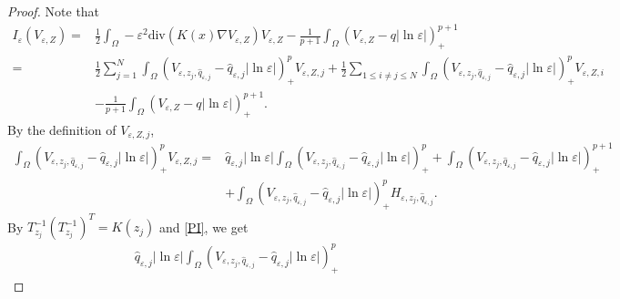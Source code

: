 \documentclass[12pt,reqno]{amsart}
\numberwithin{equation}{section}
\theoremstyle{definition}
\theoremstyle{remark}
\begin{document}
\begin{proof}
Note that
\begin{equation}\label{218}
\begin{split}
I_\varepsilon(V_{\varepsilon,Z})=&\frac{1}{2}\int_{\Omega}-\varepsilon^2\text{div}\left( K(x)\nabla V_{\varepsilon,Z}  \right)V_{\varepsilon,Z}-\frac{1}{p+1}\int_{\Omega}\left (V_{\varepsilon,Z}-q|\ln\varepsilon|\right )^{p+1}_+ \\
=&\frac{1}{2}\sum_{j=1}^N\int_{\Omega}\left (V_{\varepsilon,z_j,\hat{q}_{\varepsilon,j}}-\hat{q}_{\varepsilon,j}|\ln\varepsilon|\right )^p_+V_{\varepsilon,Z,j} +\frac{1}{2}\sum_{1\leq i\neq j\leq N}\int_{\Omega}\left (V_{\varepsilon,z_j,\hat{q}_{\varepsilon,j}}-\hat{q}_{\varepsilon,j}|\ln\varepsilon|\right )^p_+V_{\varepsilon,Z,i}\\
&-\frac{1}{p+1}\int_{\Omega}\left (V_{\varepsilon,Z}-q|\ln\varepsilon|\right )^{p+1}_+.
\end{split}
\end{equation}
By   the definition of $ V_{\varepsilon,Z,j} $, 
\begin{equation*}
\begin{split}
\int_{\Omega}\left (V_{\varepsilon,z_j,\hat{q}_{\varepsilon,j}}-\hat{q}_{\varepsilon,j}|\ln\varepsilon|\right )^p_+V_{\varepsilon,Z,j}
=&\hat{q}_{\varepsilon,j}|\ln\varepsilon|\int_{\Omega}\left (V_{\varepsilon,z_j,\hat{q}_{\varepsilon,j}}-\hat{q}_{\varepsilon,j}|\ln\varepsilon|\right )^p_+
+\int_{\Omega}\left (V_{\varepsilon,z_j,\hat{q}_{\varepsilon,j}}-\hat{q}_{\varepsilon,j}|\ln\varepsilon|\right )^{p+1}_+
\\&+\int_{\Omega}\left (V_{\varepsilon,z_j,\hat{q}_{\varepsilon,j}}-\hat{q}_{\varepsilon,j}|\ln\varepsilon|\right )^p_+H_{\varepsilon,z_j,\hat{q}_{\varepsilon,j}}.
\end{split}
\end{equation*}
By $ T_{z_j}^{-1}(T_{z_j}^{-1})^T=K(z_j) $ and \eqref{PI}, we get
\begin{equation*}
\begin{split}
\hat{q}_{\varepsilon,j}|\ln\varepsilon|\int_{\Omega}\left (V_{\varepsilon,z_j,\hat{q}_{\varepsilon,j}}-\hat{q}_{\varepsilon,j}|\ln\varepsilon|\right )^p_+

\end{split}
\end{equation*}
\end{proof}
\end{document}
